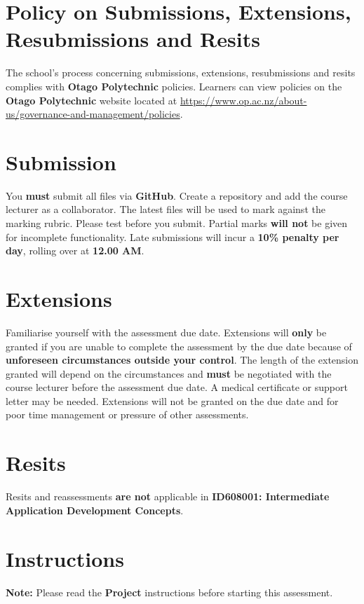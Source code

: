 \documentclass{article}
\begin{document}
	\section*{Policy on Submissions, Extensions, Resubmissions and Resits}
	The school's process concerning submissions, extensions, resubmissions and
	resits complies with \textbf{Otago Polytechnic} policies. Learners can view
	policies on the \textbf{Otago Polytechnic} website located at \href{https://www.op.ac.nz/about-us/governance-and-management/policies}{https://www.op.ac.nz/about-us/governance-and-management/policies}.

	\section*{Submission}
	You \textbf{must} submit all files via \textbf{GitHub}. Create a
	repository and add the course lecturer as a collaborator. The latest files will be used to mark against the marking rubric. Please test before you submit. Partial marks \textbf{will not} be given for incomplete functionality. Late submissions will incur a \textbf{10\% penalty per day}, rolling over at \textbf{12.00 AM}.

	\section*{Extensions}
	Familiarise yourself with the assessment due date. Extensions will \textbf{only}
	be granted if you are unable to complete the assessment by the due date
	because of \textbf{unforeseen circumstances outside your control}. The length
	of the extension granted will depend on the circumstances and \textbf{must} be
	negotiated with the course lecturer before the assessment due date. A medical
	certificate or support letter may be needed. Extensions will not be granted on
	the due date and for poor time management or pressure of other assessments.

	\section*{Resits}
	Resits and reassessments \textbf{are not} applicable in \textbf{ID608001: Intermediate
	Application Development Concepts}.

	\section*{Instructions}

	\textbf{Note:} Please read the \textbf{Project} instructions before starting this assessment. 
\end{document}
